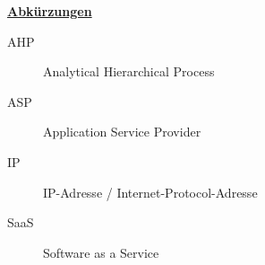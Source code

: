 \newpage
\textbf{\underline{Abkürzungen}}
\begin{description}
    \item[AHP] Analytical Hierarchical Process
    \item[ASP] Application Service Provider
    \item[IP] IP-Adresse / Internet-Protocol-Adresse
    \item[SaaS] Software as a Service
  \end{description}